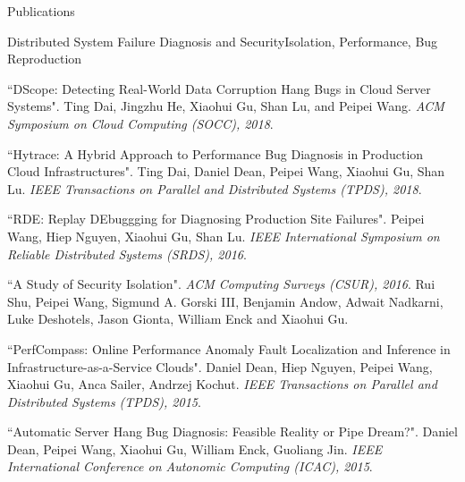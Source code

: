 \documentclass{professional} %
\begin{document}
\begin{rSection}{Publications}
\begin{rSubsection}{Distributed System Failure Diagnosis and Security}{Isolation, Performance, Bug Reproduction}
\item ``DScope: Detecting Real-World Data Corruption Hang Bugs in Cloud Server Systems". Ting Dai, Jingzhu He, Xiaohui Gu, Shan Lu, and Peipei Wang. \textit{ACM Symposium on Cloud Computing (SOCC), 2018}. \href{https://dl.acm.org/doi/pdf/10.1145/3267809.3267844}{}

\item ``Hytrace: A Hybrid Approach to Performance Bug Diagnosis in Production Cloud Infrastructures". Ting Dai, Daniel Dean, Peipei Wang, Xiaohui Gu, Shan Lu. \textit{IEEE Transactions on Parallel and Distributed Systems (TPDS), 2018}. \href{https://ieeexplore.ieee.org/stamp/stamp.jsp?arnumber=8417446}{}


\item ``RDE: Replay DEbuggging for Diagnosing Production Site Failures". Peipei Wang, Hiep Nguyen, Xiaohui Gu, Shan Lu. \textit{IEEE International Symposium on Reliable Distributed Systems (SRDS), 2016}. \href{https://ieeexplore.ieee.org/stamp/stamp.jsp?arnumber=7794362}{}

\item ``A Study of Security Isolation". \textit{ACM Computing Surveys (CSUR), 2016}. Rui Shu, Peipei Wang, Sigmund A. Gorski III, Benjamin Andow, Adwait Nadkarni, Luke Deshotels, Jason Gionta, William Enck and Xiaohui Gu. \href{https://dl.acm.org/doi/pdf/10.1145/2988545}{}

\item ``PerfCompass: Online Performance Anomaly Fault Localization and Inference in Infrastructure-as-a-Service Clouds". Daniel Dean, Hiep Nguyen, Peipei Wang, Xiaohui Gu, Anca Sailer, Andrzej Kochut. \textit{IEEE Transactions on Parallel and Distributed Systems (TPDS), 2015}. \href{https://ieeexplore.ieee.org/stamp/stamp.jsp?arnumber=7127024}{}

\item ``Automatic Server Hang Bug Diagnosis: Feasible Reality or Pipe Dream?". Daniel Dean, Peipei Wang, Xiaohui Gu, William Enck, Guoliang Jin. \textit{IEEE International Conference on Autonomic Computing (ICAC), 2015}. \href{https://ieeexplore.ieee.org/stamp/stamp.jsp?arnumber=7266943}{}


\end{rSubsection}
\end{rSection}
\end{document}
